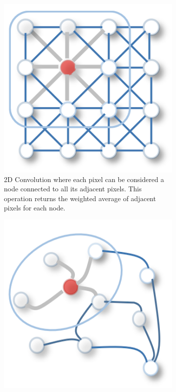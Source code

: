 \begin{figure}[ht]
    \centering
    \begin{subfigure}[b]{0.4\textwidth}
        \includegraphics[width=\textwidth]{imgs/conv.png}
        \caption{2D Convolution where each pixel can be considered a node connected to all its adjacent pixels. This operation returns the weighted average of adjacent pixels for each node.}
    \end{subfigure}
    \hfill
    \begin{subfigure}[b]{0.4\textwidth}
        \includegraphics[width=\textwidth]{imgs/graph conv.png}

\end{subfigure}
\end{figure}
